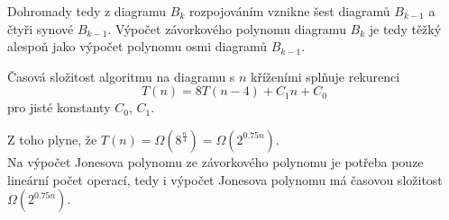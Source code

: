 \begin{dukaz}
Dohromady tedy z diagramu $B_k$ rozpojováním vznikne šest diagramů $B_{k-1}$ a čtyři synové $B_{k-1}$. Výpočet závorkového polynomu diagramu $B_k$ je tedy těžký alespoň jako výpočet polynomu osmi diagramů $B_{k-1}$. 

Časová složitost algoritmu na diagramu s $n$ kříženími splňuje rekurenci
$$ T(n) = 8T(n-4) + C_1 n + C_0  $$
pro jisté konstanty $C_0$, $C_1$.

Z toho plyne, že $T(n) = \Omega(8^{\frac{n}{4}})  =  \Omega(2^{0.75 n})$. \\

Na výpočet Jonesova polynomu ze závorkového polynomu je potřeba pouze lineární počet operací, tedy i výpočet Jonesova polynomu má časovou složitost $\Omega(2^{0.75n})$.
\end{dukaz}
